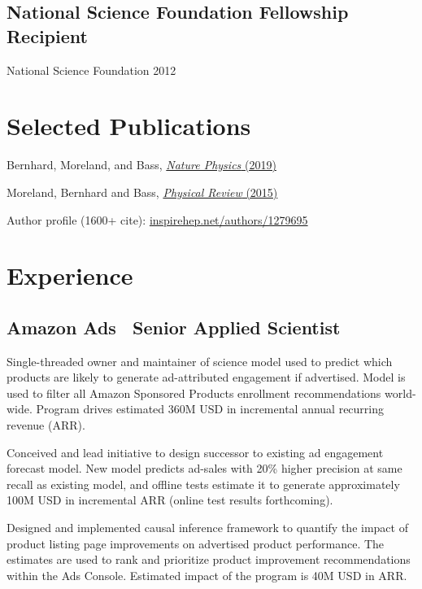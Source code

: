 \documentclass[letterpaper,10pt]{article}
\begin{document}
\begin{multicols}{2}
\subsection{National Science Foundation Fellowship Recipient}
{\small National Science Foundation \hfill 2012}

\section{Selected Publications}
\smallskip

Bernhard, Moreland, and Bass,
\href{https://www.nature.com/articles/s41567-019-0611-8}{\emph{Nature Physics} (2019)}

Moreland, Bernhard and Bass,
\href{https://arxiv.org/abs/1412.4708}{\emph{Physical Review} (2015)}

Author profile (1600+ cite):
\href{https://inspirehep.net/authors/1279695}{inspirehep.net/authors/1279695}

\columnbreak

\section{Experience}

\subsection{Amazon Ads \textbar\ Senior Applied Scientist}
\smallskip

Single-threaded owner and maintainer of science model used to predict which
products are likely to generate ad-attributed engagement if advertised.
Model is used to filter all Amazon Sponsored Products enrollment recommendations
world-wide. Program drives estimated 360M USD in incremental annual recurring
revenue (ARR).

Conceived and lead initiative to design successor to existing ad engagement
forecast model. New model predicts ad-sales with 20\% higher precision at same
recall as existing model, and offline tests estimate it to generate
approximately 100M USD in incremental ARR (online test results forthcoming).

Designed and implemented causal inference framework to quantify the impact of
product listing page improvements on advertised product performance. The
estimates are used to rank and prioritize product improvement recommendations
within the Ads Console. Estimated impact of the program is 40M USD in ARR.


\end{multicols}
\end{document}

